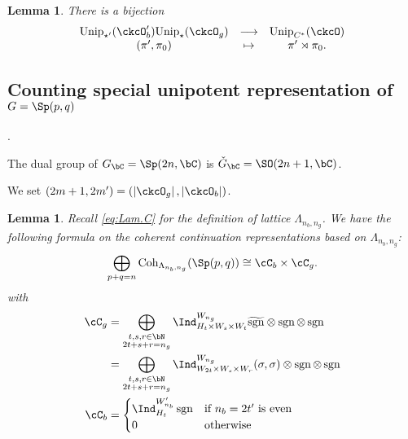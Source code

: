 \documentclass[12pt,a4paper]{amsart}
\def\abs#1{\left|{#1}\right|}
\newcommand{\sgn}{\operatorname{sgn}}
\numberwithin{equation}{section}
\newtheorem{lem}[thm]{Lemma}
\theoremstyle{remark}
\def\Unip{\mathrm{Unip}}
\def\ckGc{\check{G}_{\bC}}
\def\lamck{\lambda_\ckcO}
\def\Cint#1{\Coh_{[#1]}}
\def\Gc{G_\bC}
\def\Coh{\mathrm{Coh}}
\def\hsgn{\widetilde{\mathrm{sgn}}}
\begin{document}
\begin{lem}
  There is a bijection
    \[
      \begin{array}{ccc}
        \Unip_{\star'}(\ckcO'_{b})\Unip_{\star}(\ckcO_{g})&         \longrightarrow &\Unip_{C^{*}}(\ckcO) \\
        (\pi',\pi_{0}) & \mapsto
                         & \pi'\rtimes \pi_{0}.
      \end{array}
    \]
\end{lem}

\subsection{Counting special unipotent representation of $G=\Sp(p,q)$}.

The dual group of $\Gc = \Sp(2n,\bC)$ is $\ckGc = \SO(2n+1,\bC)$.

We set $(2m+1,2m') = (\abs{\ckcO_g},\abs{\ckcO_b})$.



\begin{lem}
  Recall \eqref{eq:Lam.C} for the definition of lattice $\Lambda_{n_{b},n_{g}}$.
  We have the following formula on the coherent continuation
  representations based on $\Lambda_{n_{b},n_{g}}$:
  \[
    \bigoplus_{p+q=n} \Coh_{\Lambda_{n_{b}, n_{g}}}(\Sp(p,q)) \cong \cC_{b}\times \cC_{g}.
  \]
  with
  \[
    \begin{split}
      \cC_g %
      &=\bigoplus_{\substack{t,s,r\in\bN\\2t+s+r=n_{g}}} \Ind_{H_{t} \times W_s\times W_t}^{W_{n_{g}}}
       \hsgn \otimes \sgn \otimes \sgn \\
      & =\bigoplus_{\substack{t,s,r\in\bN\\2t+s+r=n_{g}}} \Ind_{W_{2t}\times W_s\times W_r}^{W_{n_{g}}}
      (\sigma,\sigma)\otimes \sgn \otimes \sgn \\
      \cC_b & =
      \begin{cases}
        \Ind_{H_{t}}^{W'_{n_{b}}} \sgn &
        \text{if $n_{b}=2t'$ is even} \\
        0 & \text{otherwise}\\
      \end{cases}\\
    \end{split}
  \]
\end{lem}
\end{document}
